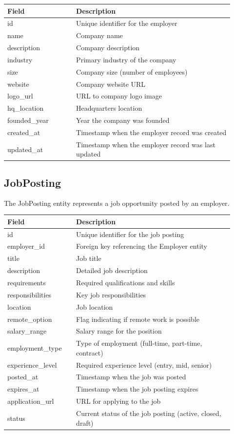 \documentclass[12pt,a4paper]{report}
\begin{document}
\begin{longtable}{p{0.28\linewidth} p{0.64\linewidth}}
\toprule
\textbf{Field} & \textbf{Description}\\
\midrule
id & Unique identifier for the employer\\
name & Company name\\
description & Company description\\
industry & Primary industry of the company\\
size & Company size (number of employees)\\
website & Company website URL\\
logo\_url & URL to company logo image\\
hq\_location & Headquarters location\\
founded\_year & Year the company was founded\\
created\_at & Timestamp when the employer record was created\\
updated\_at & Timestamp when the employer record was last updated\\
\bottomrule
\end{longtable}

\subsection{JobPosting}
The JobPosting entity represents a job opportunity posted by an employer.

\begin{longtable}{p{0.28\linewidth} p{0.64\linewidth}}
\toprule
\textbf{Field} & \textbf{Description}\\
\midrule
id & Unique identifier for the job posting\\
employer\_id & Foreign key referencing the Employer entity\\
title & Job title\\
description & Detailed job description\\
requirements & Required qualifications and skills\\
responsibilities & Key job responsibilities\\
location & Job location\\
remote\_option & Flag indicating if remote work is possible\\
salary\_range & Salary range for the position\\
employment\_type & Type of employment (full-time, part-time, contract)\\
experience\_level & Required experience level (entry, mid, senior)\\
posted\_at & Timestamp when the job was posted\\
expires\_at & Timestamp when the job posting expires\\
application\_url & URL for applying to the job\\
status & Current status of the job posting (active, closed, draft)\\
\bottomrule
\end{longtable}
\end{document}
